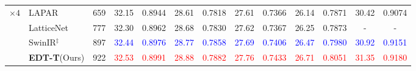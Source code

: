 \documentclass[runningheads]{llncs}
\begin{document}
\begin{table}[t]
\begin{center}
{\begin{tabular}{| c | l | c | c | c | c | c | c | c | c | c | c | c |}
\multirow{4}{*}{$\times 4$} & LAPAR~\cite{li2020lapar} & 659 & 32.15 & 0.8944 & 28.61 & 0.7818 & 27.61 & 0.7366 & 26.14 & 0.7871 & 30.42 & 0.9074 \\
					~ & LatticeNet~\cite{luo2020latticenet} & 777 & 32.30 & 0.8962 & 28.68 & 0.7830 & 27.62 & 0.7367 & 26.25 & 0.7873 & - & - \\
					~ & SwinIR{$^\ddagger$}~\cite{liang2021swinir} & 897 & \textcolor{blue}{32.44} & \textcolor{blue}{0.8976} & \textcolor{blue}{28.77} & \textcolor{blue}{0.7858} & \textcolor{blue}{27.69} & \textcolor{blue}{0.7406} & \textcolor{blue}{26.47} & \textcolor{blue}{0.7980} & \textcolor{blue}{30.92} & \textcolor{blue}{0.9151} \\
					~ & \textbf{EDT-T}(Ours) & 922 & \textcolor{red}{32.53} & \textcolor{red}{0.8991} & \textcolor{red}{28.88} & \textcolor{red}{0.7882} & \textcolor{red}{27.76} & \textcolor{red}{0.7433} & \textcolor{red}{26.71} & \textcolor{red}{0.8051} & \textcolor{red}{31.35} & \textcolor{red}{0.9180} \\
					\hline
				\end{tabular}
			}
		\end{center}
		\vspace{-0.05in}
\label{tab:lightweight_sr}
	\end{table}
	
\end{document}
